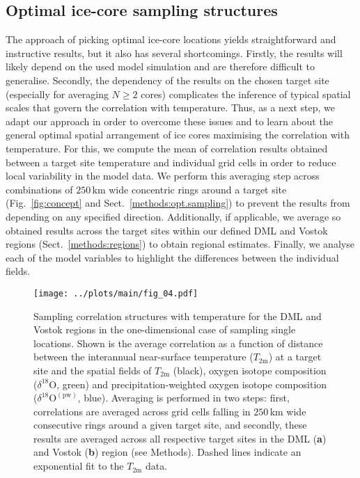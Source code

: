 \documentclass[cp, manuscript, draft]{copernicus}
\begin{document}
\subsection{Optimal ice-core sampling structures}
\label{results:optim-spacing}

The approach of picking optimal ice-core locations yields straightforward and
instructive results, but it also has several shortcomings. Firstly, the results
will likely depend on the used model simulation and are therefore difficult to
generalise. Secondly, the dependency of the results on the chosen target site
(especially for averaging $N\ge2$ cores) complicates the inference of typical
spatial scales that govern the correlation with temperature. Thus, as a next
step, we adapt our approach in order to overcome these issues and to learn about
the general optimal spatial arrangement of ice cores maximising the correlation
with temperature. For this, we compute the mean of correlation results obtained
between a target site temperature and individual grid cells in order to reduce
local variability in the model data. We perform this averaging step across
combinations of $250$\,km wide concentric rings around a target site
(Fig.~\ref{fig:concept} and Sect.~\ref{methods:opt.sampling}) to prevent the
results from depending on any specified direction. Additionally, if applicable,
we average so obtained results across the target sites within our defined DML
and Vostok regions (Sect.~\ref{methods:regions}) to obtain regional
estimates. Finally, we analyse each of the model variables to highlight the
differences between the individual fields.

\begin{figure*}[t]%
\centering
\texttt{[image: ../plots/main/fig\_04.pdf]}
\caption{%
  Sampling correlation structures with temperature for the DML and Vostok
  regions in the one-dimensional case of sampling single locations. Shown is the
  average correlation as a function of distance between the interannual
  near-surface temperature ($T_{2\mathrm{m}}$) at a target site and the spatial
  fields of $T_{2\mathrm{m}}$ (black), oxygen isotope composition
  ($\delta^{18}\mathrm{O}$, green) and precipitation-weighted oxygen isotope
  composition ($\delta^{18}\mathrm{O}^{\mathrm{(pw)}}$, blue). Averaging is
  performed in two steps: first, correlations are averaged across grid cells
  falling in $250$\,km wide consecutive rings around a given target site, and
  secondly, these results are averaged across all respective target sites in the
  DML (\textbf{a}) and Vostok (\textbf{b}) region (see Methods). Dashed lines
  indicate an exponential fit to the $T_{2\mathrm{m}}$ data.}
\label{fig:avg.cor.structure}%
\end{figure*}%
\end{document}
